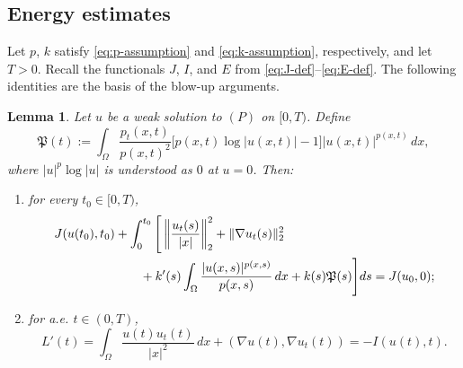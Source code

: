 \documentclass[12pt,reqno]{amsart}
\newtheorem{lemma}[theorem]{Lemma}
\theoremstyle{definition}
\theoremstyle{remark}
\numberwithin{equation}{section}
\begin{document}
\subsection{Energy estimates}

Let $p$, $k$ satisfy \eqref{eq:p-assumption} and \eqref{eq:k-assumption}, respectively, and let $T>0$. Recall the functionals $J$, $I$, and $E$ from \eqref{eq:J-def}--\eqref{eq:E-def}. The following identities are the basis of the blow-up arguments.


\begin{lemma}\label{lem:energy}
Let $u$ be a weak solution to $(P)$ on $[0,T)$. Define
\begin{equation}\label{eq:P-def}
\mathfrak P(t):=
\int_\Omega \frac{p_t(x,t)}{p(x,t)^2}
\bigl[p(x,t)\log |u(x,t)|-1\bigr]
|u(x,t)|^{p(x,t)}\,dx,
\end{equation}
where $|u|^{p}\log|u|$ is understood as $0$ at $u=0$. Then:
\begin{enumerate}
\item for every $t_0\in[0,T)$,
\begin{align}
J(u(t_0),t_0)
&+\int_0^{t_0}\Bigg[
\left\|\frac{u_t(s)}{|x|}\right\|_2^2
+\|\nabla u_t(s)\|_2^2 \notag\\
&\qquad
+k'(s)\int_\Omega\frac{|u(x,s)|^{p(x,s)}}{p(x,s)}\,dx
+k(s)\mathfrak P(s)
\Bigg]ds
=J(u_0,0);                                      \label{eq:energy-identity}
\end{align}
\item for a.e. $t\in(0,T)$,
\begin{equation}\label{eq:L-identity}
L'(t)
=\int_\Omega\frac{u(t)u_t(t)}{|x|^2}\,dx
+(\nabla u(t),\nabla u_t(t))
=-I(u(t),t).
\end{equation}
\end{enumerate}
\end{lemma}
\end{document}
